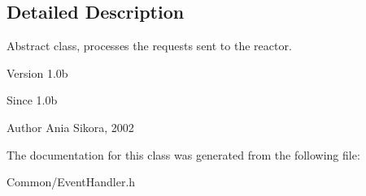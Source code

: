 \subsection{Detailed Description}
Abstract class, processes the requests sent to the reactor. 

\begin{DoxyVersion}{Version}
1.\-0b 
\end{DoxyVersion}
\begin{DoxySince}{Since}
1.\-0b 
\end{DoxySince}
\begin{DoxyAuthor}{Author}
Ania Sikora, 2002 
\end{DoxyAuthor}


The documentation for this class was generated from the following file\-:\begin{DoxyCompactItemize}
\item 
Common/Event\-Handler.\-h\end{DoxyCompactItemize}
